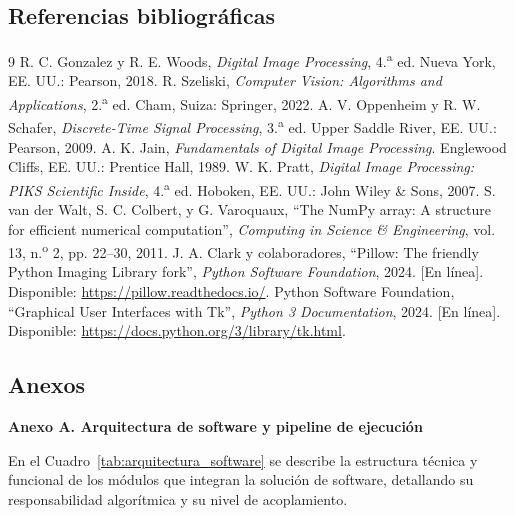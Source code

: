 \documentclass[11pt]{article}
\begin{document}
\subsection{Referencias bibliográficas}
\begin{thebibliography}{9}
 R. C. Gonzalez y R. E. Woods, \textit{Digital Image Processing}, 4.\textsuperscript{a} ed. Nueva York, EE. UU.: Pearson, 2018.
 R. Szeliski, \textit{Computer Vision: Algorithms and Applications}, 2.\textsuperscript{a} ed. Cham, Suiza: Springer, 2022.
 A. V. Oppenheim y R. W. Schafer, \textit{Discrete-Time Signal Processing}, 3.\textsuperscript{a} ed. Upper Saddle River, EE. UU.: Pearson, 2009.
 A. K. Jain, \textit{Fundamentals of Digital Image Processing}. Englewood Cliffs, EE. UU.: Prentice Hall, 1989.
 W. K. Pratt, \textit{Digital Image Processing: PIKS Scientific Inside}, 4.\textsuperscript{a} ed. Hoboken, EE. UU.: John Wiley \& Sons, 2007.
 S. van der Walt, S. C. Colbert, y G. Varoquaux, ``The NumPy array: A structure for efficient numerical computation'', \textit{Computing in Science \& Engineering}, vol. 13, n.\textsuperscript{o} 2, pp. 22--30, 2011.
 J. A. Clark y colaboradores, ``Pillow: The friendly Python Imaging Library fork'', \textit{Python Software Foundation}, 2024. [En línea]. Disponible: \url{https://pillow.readthedocs.io/}.
 Python Software Foundation, ``Graphical User Interfaces with Tk'', \textit{Python 3 Documentation}, 2024. [En línea]. Disponible: \url{https://docs.python.org/3/library/tk.html}.
\end{thebibliography}

\subsection{Anexos}

\textbf{Anexo A. Arquitectura de software y pipeline de ejecución}

En el Cuadro~\ref{tab:arquitectura_software} se describe la estructura técnica y funcional de los módulos que integran la solución de software, detallando su responsabilidad algorítmica y su nivel de acoplamiento.
\end{document}
